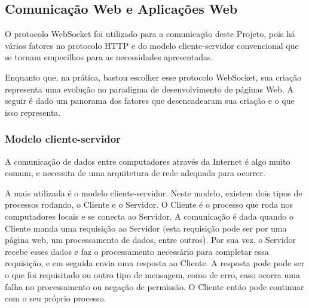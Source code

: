 \documentclass[a4paper,12pt]{article}
\begin{document}




\newpage
\subsection{Comunicação Web e Aplicações Web}


O protocolo WebSocket foi utilizado para a comunicação deste Projeto, pois há vários fatores no protocolo HTTP e do modelo cliente-servidor convencional que se tornam empecilhos para as necessidades apresentadas.

Enquanto que, na prática, bastou escolher esse protocolo WebSocket, sua criação representa uma evolução no paradigma de desenvolvimento de páginas Web. A seguir é dado um panorama dos fatores que desencadearam sua criação e o que isso representa.


\subsubsection{Modelo cliente-servidor}

A comunicação de dados entre computadores através da Internet é algo muito comum, e necessita de uma arquitetura de rede adequada para ocorrer.

A mais utilizada é o modelo cliente-servidor. Neste modelo, existem dois tipos de processos rodando, o Cliente e o Servidor. O Cliente é o processo que roda nos computadores locais e se conecta ao Servidor. A comunicação é dada quando o Cliente manda uma requisição ao Servidor (esta requisição pode ser por uma página web, um processamento de dados, entre outros). Por sua vez, o Servidor recebe esses dados e faz o processamento necessário para completar essa requisição, e em seguida envia uma resposta ao Cliente. A resposta pode pode ser o que foi requisitado ou outro tipo de mensagem, como de erro, caso ocorra uma falha no processamento ou negação de permissão. O Cliente então pode continuar com o seu próprio processo.


\end{document}
